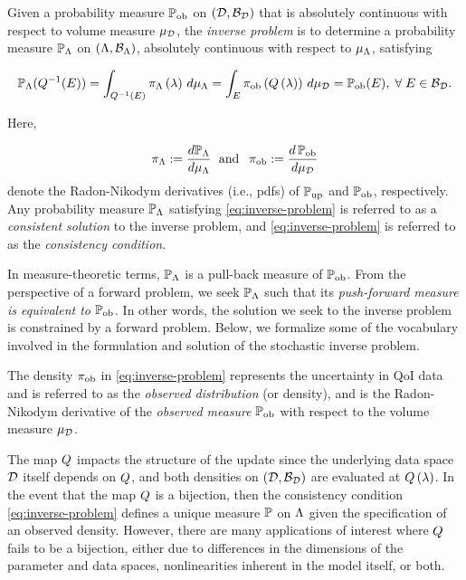 \begin{defn}\label{defn:inverse-problem}
  Given a probability measure $\operatorname*{\mathbb{P}_{ob}}$ on $(\mathcal{D}, \mathcal{B}_{\mathcal{D}})$ that is absolutely continuous with respect to volume measure $\mu_{\mathcal{D}}$, the \emph{inverse problem} is to determine a probability measure $\mathbb{P}_{\Lambda}$ on $({\Lambda}, \mathcal{B}_{{\Lambda}})$, absolutely continuous with respect to $\mu_{{\Lambda}}$, satisfying

  \begin{equation}\label{eq:inverse-problem}
    \mathbb{P}_{\Lambda} (Q^{-1}(E)) = \int_{Q^{-1}(E)} \pi_{\Lambda} \left ( \lambda \right ) \, d\mu_{{\Lambda}} = \int_E \operatorname*{\pi_{ob}} \left ( Q\left ( \lambda \right ) \right ) \, d\mu_{\mathcal{D}} = \operatorname*{\mathbb{P}_{ob}}(E), \; \forall \; E \in \mathcal{B}_{\mathcal{D}}.
  \end{equation}

  \noindent Here,

  \begin{equation*}
    \pi_{\Lambda} := \frac{d\mathbb{P}_{\Lambda}}{d\mu_{{\Lambda}}} \;\text{ and }\; \operatorname*{\pi_{ob}} := \frac{d\operatorname*{\mathbb{P}_{ob}}}{d\mu_{\mathcal{D}}}
  \end{equation*}
  denote the Radon-Nikodym derivatives (i.e., pdfs) of $\operatorname*{\mathbb{P}_{up}}$ and $\operatorname*{\mathbb{P}_{ob}}$, respectively.
  Any probability measure $\mathbb{P}_{\Lambda}$ satisfying \eqref{eq:inverse-problem} is referred to as a \emph{consistent solution} to the inverse problem, and \eqref{eq:inverse-problem} is referred to as the \emph{consistency condition}.
\end{defn}

In measure-theoretic terms, $\mathbb{P}_{\Lambda}$ is a pull-back measure of $\operatorname*{\mathbb{P}_{ob}}$.
From the perspective of a forward problem, we seek $\mathbb{P}_{\Lambda}$ such that its \emph{push-forward measure is equivalent to} $\operatorname*{\mathbb{P}_{ob}}$.
In other words, the solution we seek to the inverse problem is constrained by a forward problem.
Below, we formalize some of the vocabulary involved in the formulation and solution of the stochastic inverse problem.

\begin{defn}\label{defn:observed}
  The density $\operatorname*{\pi_{ob}}$ in \eqref{eq:inverse-problem} represents the uncertainty in QoI data and is referred to as the \emph{observed distribution} (or density), and is the Radon-Nikodym derivative of the \emph{observed measure} $\operatorname*{\mathbb{P}_{ob}}$ with respect to the volume measure $\mu_{\mathcal{D}}$.
\end{defn}

The map $Q$ impacts the structure of the update since the underlying data space $\mathcal{D}$ itself depends on $Q$, and both densities on $(\mathcal{D}, \mathcal{B}_{\mathcal{D}})$ are evaluated at $Q\left ( \lambda \right )$.
In the event that the map $Q$ is a bijection, then the consistency condition \eqref{eq:inverse-problem} defines a unique measure $\mathbb{P}$ on ${\Lambda}$ given the specification of an observed density.
However, there are many applications of interest where $Q$ fails to be a bijection, either due to differences in the dimensions of the parameter and data spaces, nonlinearities inherent in the model itself, or both.


